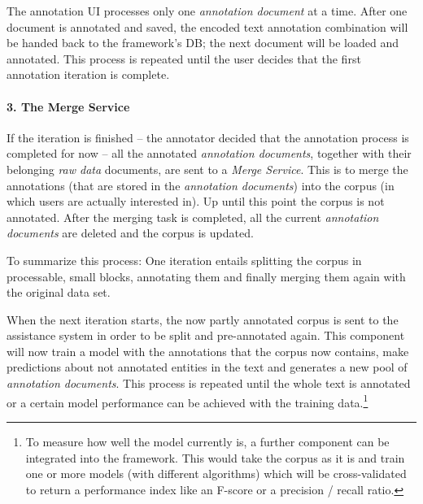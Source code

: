 		The annotation \ac{UI} processes only one \textit{annotation document} at a time. After one document is annotated and saved, the encoded text annotation combination will be handed back to the framework's \ac{DB}; the next document will be loaded and annotated. This process is repeated until the user decides that the first annotation iteration is complete.

		\paragraph{3. The Merge Service}
		If the iteration is finished -- the annotator decided that the annotation process is completed for now -- all the annotated \textit{annotation documents}, together with their belonging \textit{raw data} documents, are sent to a \textit{Merge Service}. This is to merge the annotations (that are stored in the \textit{annotation documents}) into the corpus (in which users are actually interested in). Up until this point the corpus is not annotated. After the merging task is completed, all the current \textit{annotation documents} are deleted and the corpus is updated.

		To summarize this process: One iteration entails splitting the corpus in processable, small blocks, annotating them and finally merging them again with the original data set.

		When the next iteration starts, the now partly annotated corpus is sent to the assistance system in order to be split and pre-annotated again. This component will now train a model with the annotations that the corpus now contains, make predictions about not annotated entities in the text and generates a new pool of \textit{annotation documents}. This process is repeated until the whole text is annotated or a certain model performance can be achieved with the training data.\footnote{To measure how well the model currently is, a further component can be integrated into the framework. This would take the corpus as it is and train one or more models (with different algorithms) which will be cross-validated to return a performance index like an F-score or a precision / recall ratio.}
